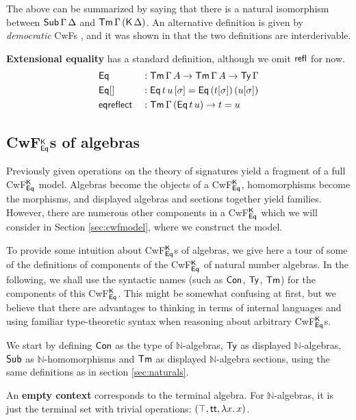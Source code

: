 \documentclass[acmsmall,review]{acmart}\settopmatter{printfolios=true,printccs=false,printacmref=false}
\begin{document}
The above can be summarized by saying that there is a natural isomorphism
between $\Tms\,\Gamma\,\Delta$ and $\Tm\,\Gamma\,(\K\,\Delta)$. An
alternative definition is given by \emph{democratic} CwFs
\cite{clairambault2014biequivalence}, and it was shown in
\cite{forsberg-phd} that the two definitions are interderivable.

\textbf{Extensional equality} has a standard definition, although we omit $\refl$ for now.
\begin{alignat*}{5}
  & \Eq      && : \Tm\,\Gamma\,A \ra \Tm\,\Gamma\,A \ra \Ty\,\Gamma \\
  & \Eq[]    && : \Eq\,t\,u\,[\sigma] = \Eq\,(t[\sigma])\,(u[\sigma]) \\
  & \eqreflect && : \Tm\,\Gamma\,(\Eq\,t\,u) \ra t = u
\end{alignat*}

\subsection{CwF$^\K_{\Eq}$s of algebras}
\label{sec:cwfalg}

Previously given operations on the theory of signatures yield a
fragment of a full CwF$^\K_{\Eq}$ model. Algebras become the objects
of a CwF$^\K_{\Eq}$, homomorphisms become the morphisms, and displayed
algebras and sections together yield families. However, there are
numerous other components in a CwF$^\K_{\Eq}$ which we will consider
in Section \ref{sec:cwfmodel}, where we construct the model.

To provide some intuition about CwF$^\K_{\Eq}$s of algebras, we give
here a tour of some of the definitions of components of the
CwF$^\K_{\Eq}$ of natural number algebras. In the following, we shall
use the syntactic names (such as $\Con$, $\Ty$, $\Tm$) for the
components of this CwF$^\K_{\Eq}$. This might be somewhat confusing at
first, but we believe that there are advantages to thinking in terms
of internal languages and using familiar type-theoretic syntax when
reasoning about arbitrary CwF$^\K_{\Eq}$s.

We start by defining $\Con$ as the type of $\mathbb{N}$-algebras,
$\Ty$ as displayed $\mathbb{N}$-algebras, $\Tms$ as
$\mathbb{N}$-homomorphisms and $\Tm$ as displayed
$\mathbb{N}$-algebra sections, using the same definitions as in section
\ref{sec:naturals}.

An \textbf{empty context} corresponds to the terminal algebra.  For
$\mathbb{N}$-algebras, it is just the terminal set with trivial
operations: $(\top, \tt, \lambda x.\,x)$.
\end{document}
